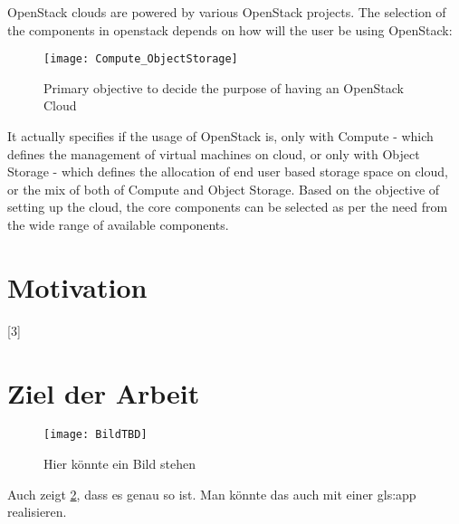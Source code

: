 OpenStack clouds are powered by various OpenStack projects.
The selection of the components in openstack depends on how will the user be using OpenStack:

\begin{figure}[H]
  \centering
  \texttt{[image: Compute\_ObjectStorage]}
  \caption{Primary objective to decide the purpose of having an OpenStack Cloud}\label{fig:Compute_ObjectStorage}
\end{figure}

It actually specifies if the usage of OpenStack is, only with Compute - which defines the management of virtual machines on cloud, or only with Object Storage - which defines the allocation of end user based storage space on cloud, or the mix of both of Compute and Object Storage. Based on the objective of setting up the cloud, the core components can be selected as per the need from the wide range of available components.

\section{Motivation}\label{sec:motivation}

[3]
\blindtext[1]

\section{Ziel der Arbeit}\label{sec:ziel}

\blindtext[1]

\begin{figure}[htpb]
  \centering
  \texttt{[image: BildTBD]}
  \caption{Hier könnte ein Bild stehen}\label{fig:bildtbd}
\end{figure}

Auch zeigt \cref{fig:bildtbd}, dass es genau so ist. Man könnte das auch mit einer \gls{gls:app}
realisieren. 

